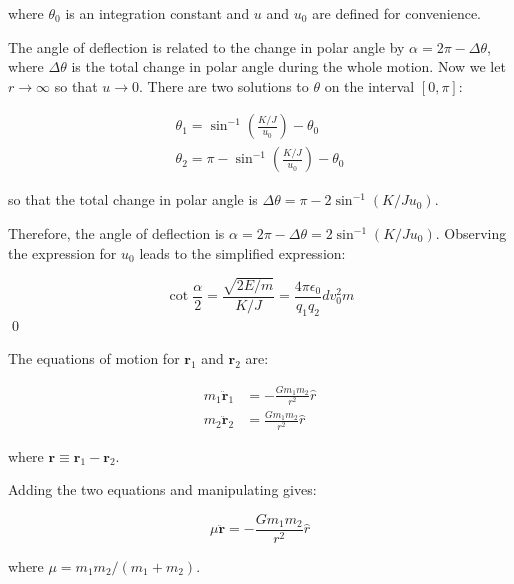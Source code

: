 \documentclass[12pt]{article}
\begin{document}
where $\theta_{0}$ is an integration constant and $u$ and $u_{0}$ are defined for convenience.

The angle of deflection is related to the change in polar angle by $\alpha = 2\pi - \Delta \theta$, where $\Delta \theta$ is the total change in polar angle during the whole motion. Now we let $r \to \infty$ so that $u \to 0$. There are two solutions to $\theta$ on the interval $[0, \pi]$:

\begin{equation}
\begin{split}
    \theta_{1} = \sin^{-1} {\left( \frac{K/J}{u_{0}} \right)} - \theta_{0} \\
    \theta_{2} = \pi - \sin^{-1} {\left( \frac{K/J}{u_{0}} \right)} - \theta_{0}
\end{split}
\end{equation}

so that the total change in polar angle is $\Delta \theta = \pi - 2\sin^{-1}{(K/Ju_{0})}$.

Therefore, the angle of deflection is $\alpha = 2\pi - \Delta \theta = 2\sin^{-1}{(K/Ju_{0})}$. Observing the expression for $u_{0}$ leads to the simplified expression:

\begin{equation}
    \cot{\frac{\alpha}{2}} = \frac{\sqrt{2E/m}}{K/J} = \frac{4\pi \epsilon_{0}}{q_{1}q_{2}} d v_{0}^{2} m
\end{equation}
\qed



The equations of motion for $\mathbf{r}_{1}$ and $\mathbf{r}_{2}$ are:

\begin{equation}
\begin{split}
    m_{1} \ddot{\mathbf{r}}_{1} &= -\frac{Gm_{1}m_{2}}{r^{2}} \hat{r} \\
    m_{2} \ddot{\mathbf{r}}_{2} &= \frac{Gm_{1}m_{2}}{r^{2}} \hat{r}
\end{split}
\end{equation}

where $\mathbf{r} \equiv \mathbf{r}_{1} - \mathbf{r}_{2}$.

Adding the two equations and manipulating gives:

\begin{equation}
    \mu \ddot{\mathbf{r}} = -\frac{Gm_{1}m_{2}}{r^{2}} \hat{r}
\end{equation}

where $\mu = m_{1}m_{2}/(m_{1} + m_{2})$.
\end{document}
